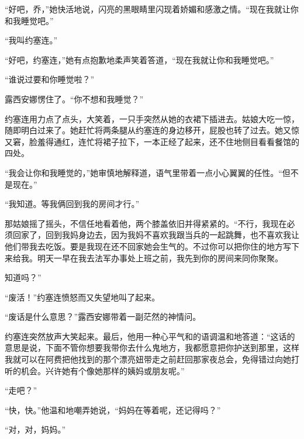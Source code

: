     “好吧，乔，”她快活地说，闪亮的黑眼睛里闪现着娇媚和感激之情。“现在我就让你和我睡觉吧。”

    “我叫约塞连。”

    “好吧，约塞连，”她有点抱歉地柔声笑着答道，“现在我就让你和我睡觉吧。”

    “谁说过要和你睡觉啦？”

    露西安娜愣住了。“你不想和我睡觉？”

    约塞连用力点了点头，大笑着，一只手突然从她的衣裙下插进去。姑娘大吃一惊，随即明白过来了。她赶忙将两条腿从约塞连的身边移开，屁股也转了过去。她又惊又窘，脸羞得通红，连忙将裙子拉下，一本正经了起来，还不住地侧目看看餐馆的四处。

    “我会让你和我睡觉的，”她审慎地解释道，语气里带着一点小心翼翼的任性。“但不是现在。”

    “我知道。等我俩回到我的房间才行。”

    那姑娘摇了摇头，不信任地看着他，两个膝盖依旧并得紧紧的。“不行，我现在必须回家了，回到我妈身边去，因为我妈不喜欢我跟当兵的一起跳舞，也不喜欢我让他们带我去吃饭。要是我现在还不回家她会生气的。不过你可以把你住的地方写下来给我。明天一早在我去法军办事处上班之前，我先到你的房间来同你聚聚。

    知道吗？”

    “废活！”约塞连愤怒而又失望地叫了起来。

    “废话是什么意思？”露西安娜带着一副茫然的神情问。

    约塞连突然放声大笑起来。最后，他用一种心平气和的语调温和地答道：“这话的意思是说，下面不管你想要我带你去什么鬼地方，我都愿意把你护送到那里，这样我就可以在阿费把他找到的那个漂亮妞带走之前赶回那家夜总会，免得错过向她打听的机会。兴许她有个像她那样的姨妈或朋友呢。”

    “走吧？”

    “快，快。”他温和地嘲弄她说，“妈妈在等着呢，还记得吗？”

    “对，对，妈妈。”

